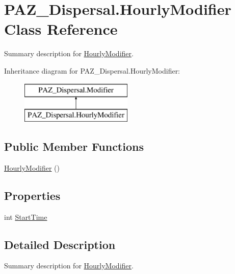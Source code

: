 \hypertarget{class_p_a_z___dispersal_1_1_hourly_modifier}{\section{P\-A\-Z\-\_\-\-Dispersal.\-Hourly\-Modifier Class Reference}
\label{class_p_a_z___dispersal_1_1_hourly_modifier}
}


Summary description for \hyperlink{class_p_a_z___dispersal_1_1_hourly_modifier}{Hourly\-Modifier}.  


Inheritance diagram for P\-A\-Z\-\_\-\-Dispersal.\-Hourly\-Modifier\-:\begin{figure}[H]
\begin{center}
\leavevmode
\includegraphics[height=2.000000cm]{class_p_a_z___dispersal_1_1_hourly_modifier}
\end{center}
\end{figure}
\subsection*{Public Member Functions}
\begin{DoxyCompactItemize}
\item 
\hyperlink{class_p_a_z___dispersal_1_1_hourly_modifier_ad472ed4ab92f00e3e7666e2eac4e4e78}{Hourly\-Modifier} ()
\end{DoxyCompactItemize}
\subsection*{Properties}
\begin{DoxyCompactItemize}
\item 
int \hyperlink{class_p_a_z___dispersal_1_1_hourly_modifier_a2ca1812cea6e92dec469f8e680a7ce60}{Start\-Time}
\end{DoxyCompactItemize}


\subsection{Detailed Description}
Summary description for \hyperlink{class_p_a_z___dispersal_1_1_hourly_modifier}{Hourly\-Modifier}. 




